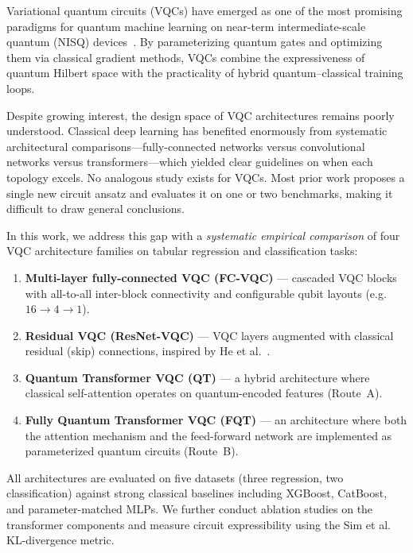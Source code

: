 
Variational quantum circuits (VQCs) have emerged as one of the most promising
paradigms for quantum machine learning on near-term intermediate-scale quantum
(NISQ) devices~\cite{cerezo2021variational,benedetti2019parameterized}.
By parameterizing quantum gates and optimizing them via classical gradient
methods, VQCs combine the expressiveness of quantum Hilbert space with the
practicality of hybrid quantum--classical training loops.

Despite growing interest, the design space of VQC architectures remains
poorly understood.  Classical deep learning has benefited enormously from
systematic architectural comparisons---fully-connected networks versus
convolutional networks versus transformers---which yielded clear guidelines on
when each topology excels.  No analogous study exists for VQCs.  Most prior
work proposes a single new circuit ansatz and evaluates it on one or two
benchmarks, making it difficult to draw general conclusions.

In this work, we address this gap with a \emph{systematic empirical
comparison} of four VQC architecture families on tabular regression and
classification tasks:

\begin{enumerate}
  \item \textbf{Multi-layer fully-connected VQC (FC-VQC)} ---
    cascaded VQC blocks with all-to-all inter-block connectivity
    and configurable qubit layouts (e.g.\ $16 \to 4 \to 1$).
  \item \textbf{Residual VQC (ResNet-VQC)} ---
    VQC layers augmented with classical residual (skip) connections,
    inspired by He et al.~\cite{he2016deep}.
  \item \textbf{Quantum Transformer VQC (QT)} ---
    a hybrid architecture where classical self-attention operates on
    quantum-encoded features (Route~A).
  \item \textbf{Fully Quantum Transformer VQC (FQT)} ---
    an architecture where both the attention mechanism and the
    feed-forward network are implemented as parameterized quantum
    circuits (Route~B).
\end{enumerate}

All architectures are evaluated on five datasets (three regression, two
classification) against strong classical baselines including XGBoost,
CatBoost, and parameter-matched MLPs.  We further conduct ablation studies
on the transformer components and measure circuit expressibility using the
Sim et al.~\cite{sim2019expressibility} KL-divergence metric.

